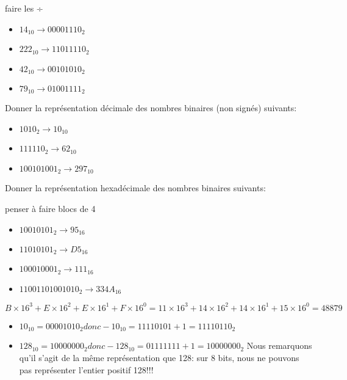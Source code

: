 \documentclass[a4paper,11pt]{article}
\begin{document}
\begin{Form}
\begin{exo}
\begin{commentprof}
faire les ÷
\end{commentprof}
\begin{itemize}
\item $14_{10} \rightarrow 00001110_2$
\item $222_{10} \rightarrow 11011110_2$
\item $42_{10} \rightarrow 00101010_2$
\item $79_{10} \rightarrow 01001111_2$
\end{itemize}
\end{exo}
\begin{exo}
Donner la représentation décimale des nombres binaires (non signés) suivants:
\begin{itemize}
\item $1010_2 \rightarrow 10_{10}$
\item $111110_2 \rightarrow 62_{10}$
\item $100101001_2 \rightarrow 297_{10}$
\end{itemize}
\end{exo}
\begin{exo}
Donner la représentation hexadécimale des nombres binaires suivants:
\begin{commentprof}
penser à faire blocs de 4
\end{commentprof}
\begin{itemize}
\item $10010101_2 \rightarrow 95_{16}$
\item $11010101_2 \rightarrow D5_{16}$
\item $100010001_2 \rightarrow 111_{16}$
\item $11001101001010_2 \rightarrow 334A_{16}$
\end{itemize}
\end{exo}
\begin{exo}
$B×16^3+E×16^2+E×16^1+F×16^0=11×16^3+14×16^2+14×16^1+15×16^0=48879$
\end{exo}
\begin{exo}
\begin{itemize}
\item $10_{10}=00001010_2 donc -10_{10}=11110101+1=11110110_2$
\item $128_{10}=10000000_2 donc -128_{10}=01111111+1=10000000_2$ Nous remarquons qu'il s'agit de la même représentation que 128: sur 8 bits, nous ne pouvons pas représenter l'entier positif 128!!!

\end{itemize}
\end{exo}
\end{Form}
\end{document}

